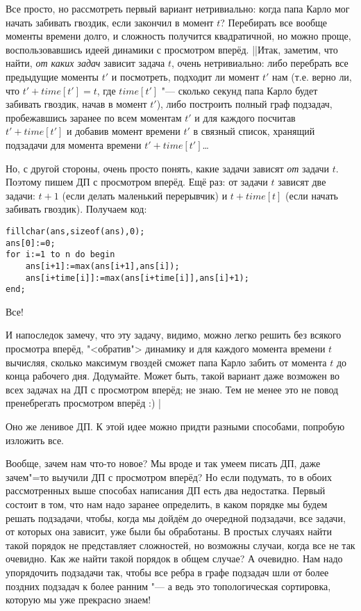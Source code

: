 Все просто, но рассмотреть первый вариант 
нетривиально: когда папа Карло мог начать забивать гвоздик, если закончил в момент $t$? Перебирать 
все вообще моменты времени долго, и сложность получится квадратичной, но можно проще, 
воспользовавшись идеей динамики с просмотром вперёд.
||Итак, заметим, что найти, \textit{от каких задач} зависит задача $t$, очень нетривиально: либо
перебрать все предыдущие моменты $t'$ и посмотреть, подходит ли момент $t'$ нам (т.е. верно ли, что 
$t'+time[t']=t$, где $time[t']$ "--- сколько секунд папа Карло будет забивать гвоздик, начав в 
момент $t'$), либо построить полный граф подзадач, пробежавшись заранее по всем моментам $t'$ и для 
каждого посчитав $t'+time[t']$ и добавив момент времени $t'$ в связный список, хранящий подзадачи 
для момента времени $t'+time[t']$\dots

Но, с другой стороны, очень просто понять, какие задачи зависят \textit{от} задачи $t$. Поэтому 
пишем ДП с просмотром вперёд. Ещё раз: от задачи $t$ зависят две задачи: $t+1$ (если делать 
маленький перерывчик) и $t+time[t]$ (если начать забивать гвоздик). Получаем код:
\begin{codesampleo}\begin{verbatim}
fillchar(ans,sizeof(ans),0);
ans[0]:=0;
for i:=1 to n do begin
    ans[i+1]:=max(ans[i+1],ans[i]); 
    ans[i+time[i]]:=max(ans[i+time[i]],ans[i]+1);
end;
\end{verbatim}\end{codesampleo}
Все!

И напоследок замечу, что эту задачу, видимо, можно легко решить без всякого просмотра вперёд, 
"<обратив"> динамику и для каждого момента времени $t$ вычисляя, сколько максимум гвоздей сможет 
папа Карло забить от момента $t$ до конца рабочего дня. Додумайте. Может быть, такой вариант даже 
возможен во всех задачах на ДП с просмотром вперёд; не знаю. Тем не менее это не повод пренебрегать 
просмотром вперёд :)
|\label{buratino}

 Оно же ленивое ДП.
К этой идее можно придти разными способами, попробую изложить все.

Вообще, зачем нам что-то новое? Мы вроде и так умеем писать ДП, даже зачем"=то выучили ДП с 
просмотром вперёд? Но если подумать, то в обоих рассмотренных выше способах написания ДП есть два 
недостатка. Первый состоит в том, что нам надо заранее определить, в каком порядке мы будем решать 
подзадачи, чтобы, когда мы дойдём до очередной подзадачи, все задачи, от которых она зависит, уже 
были бы обработаны. В простых случаях найти такой порядок не представляет сложностей, но возможны 
случаи, когда все не так очевидно. Как же найти такой порядок в общем случае? А очевидно. Нам надо 
упорядочить подзадачи так, чтобы все ребра в графе подзадач шли от более поздних подзадач к более 
ранним "--- а ведь это топологическая сортировка, которую мы уже прекрасно знаем!


